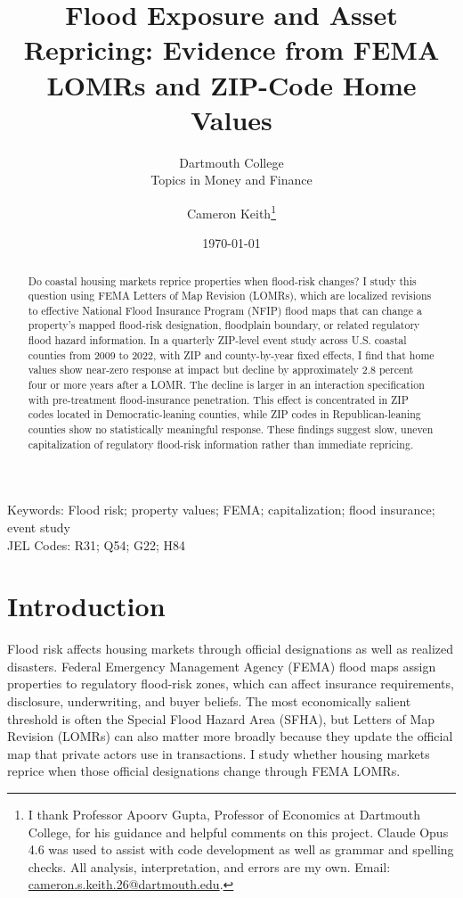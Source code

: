 \documentclass[12pt]{article}
\title{Flood Exposure and Asset Repricing: Evidence from FEMA LOMRs and ZIP-Code Home Values}
\subtitle{Dartmouth College\\Topics in Money and Finance}
\author{Cameron Keith\thanks{I thank Professor Apoorv Gupta, Professor of Economics at Dartmouth College, for his guidance and helpful comments on this project. Claude Opus 4.6 was used to assist with code development as well as grammar and spelling checks. All analysis, interpretation, and errors are my own. \newline Email: \href{mailto:cameron.s.keith.26@dartmouth.edu}{cameron.s.keith.26@dartmouth.edu}.}}
\date{\today}
\begin{document}
\maketitle

\begin{abstract}
Do coastal housing markets reprice properties when flood-risk changes? I study this question using FEMA Letters of Map Revision (LOMRs), which are localized revisions to effective National Flood Insurance Program (NFIP) flood maps that can change a property's mapped flood-risk designation, floodplain boundary, or related regulatory flood hazard information. In a quarterly ZIP-level event study across U.S. coastal counties from 2009 to 2022, with ZIP and county-by-year fixed effects, I find that home values show near-zero response at impact but decline by approximately 2.8 percent four or more years after a LOMR. The decline is larger in an interaction specification with pre-treatment flood-insurance penetration. This effect is concentrated in ZIP codes located in Democratic-leaning counties, while ZIP codes in Republican-leaning counties show no statistically meaningful response. These findings suggest slow, uneven capitalization of regulatory flood-risk information rather than immediate repricing.
\end{abstract}

\doublespacing
\noindent Keywords: Flood risk; property values; FEMA; capitalization; flood insurance; event study
\\
JEL Codes: R31; Q54; G22; H84
\newpage
{}


\section{Introduction}\label{sec:intro}

Flood risk affects housing markets through official designations as well as realized disasters. Federal Emergency Management Agency (FEMA) flood maps assign properties to regulatory flood-risk zones, which can affect insurance requirements, disclosure, underwriting, and buyer beliefs. The most economically salient threshold is often the Special Flood Hazard Area (SFHA), but Letters of Map Revision (LOMRs) can also matter more broadly because they update the official map that private actors use in transactions. I study whether housing markets reprice when those official designations change through FEMA LOMRs.
\end{document}
